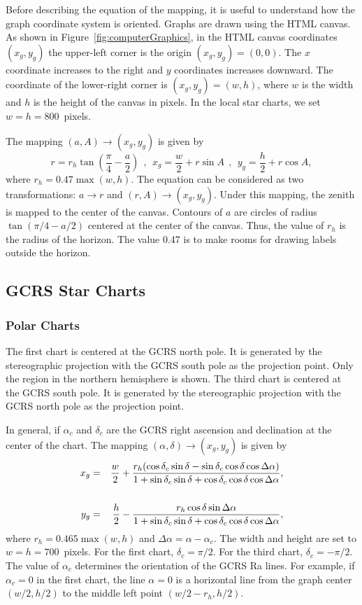 \documentclass[12pt]{article}
\newcommand \beq {\begin{equation}}
\newcommand \eeq {\end{equation}}
\newcommand \beqn {\begin{eqnarray}}
\newcommand \eeqn {\end{eqnarray}}
\begin{document}
Before describing the equation of the mapping, it is useful to understand how the 
graph coordinate system is oriented. Graphs are drawn using the HTML canvas. 
As shown in Figure~\ref{fig:computerGraphics}, in the HTML canvas coordinates $(x_g,y_g)$
the upper-left corner is the origin $(x_g,y_g)=(0,0)$. The $x$ coordinate increases to the 
right and $y$ coordinates increases downward. The coordinate of the lower-right 
corner is $(x_g,y_g)=(w,h)$, where $w$ is the width and $h$ is the height of the canvas 
in pixels. In the local star charts, we set $w=h=800$~pixels.

The mapping $(a,A) \rightarrow (x_g,y_g)$ is given by 
\beq 
  r = r_h \tan\left( \frac{\pi}{4} -\frac{a}{2}\right) \ \ , \ \ 
  x_g = \frac{w}{2} + r \sin A \ \ , \ \ y_g = \frac{h}{2} + r \cos A , 
\label{eq:stereographicHor}
\eeq
where $r_h = 0.47\max(w,h)$. The equation can be considered as two transformations: 
$a \rightarrow r$ and $(r,A) \rightarrow (x_g, y_g)$. Under this mapping, the zenith 
is mapped to the center of the canvas. Contours of $a$ are circles 
of radius $\tan(\pi/4 - a/2)$ centered at the center of the canvas. Thus, the value of 
$r_h$ is the radius of the horizon. The value 0.47 is to make rooms for drawing labels 
outside the horizon.

\subsection{GCRS Star Charts}

\subsubsection{Polar Charts} 

The first chart is centered at the GCRS north pole. It is generated by 
the stereographic projection with the GCRS south pole as the projection 
point. Only the region in the northern hemisphere is shown. The third chart 
is centered at the GCRS south pole. It is generated by the stereographic projection 
with the GCRS north pole as the projection point. 

In general, if $\alpha_c$ and $\delta_c$ are the GCRS right ascension and declination 
at the center of the chart. The mapping $(\alpha,\delta) \rightarrow (x_g,y_g)$ is 
given by 
\beqn
  x_g &=& \frac{w}{2} + \frac{r_h (\cos \delta_c \sin \delta 
- \sin \delta_c \cos \delta \cos \Delta \alpha )}{1 + \sin \delta_c \sin \delta 
+ \cos \delta_c \cos \delta \cos \Delta \alpha} ,
\label{eq:stereographicXg} \\ \cr
  y_g &=& \frac{h}{2} - \frac{r_h \cos \delta \sin \Delta \alpha}{1 + 
\sin \delta_c \sin \delta + \cos \delta_c \cos \delta \cos \Delta \alpha} , 
\label{eq:stereographicYg}
\eeqn
where $r_h = 0.465\max(w,h)$ and $\Delta \alpha = \alpha - \alpha_c$. 
The width and height are set to $w=h=700$~pixels.
For the first chart, $\delta_c=\pi/2$. For the third chart, $\delta_c=-\pi/2$. 
The value of $\alpha_c$ determines the orientation of the GCRS Ra lines. 
For example, if $\alpha_c=0$ in the first chart, the line $\alpha=0$ 
is a horizontal line from the graph center $(w/2,h/2)$ to the 
middle left point $(w/2 - r_h, h/2)$. 
\end{document}
